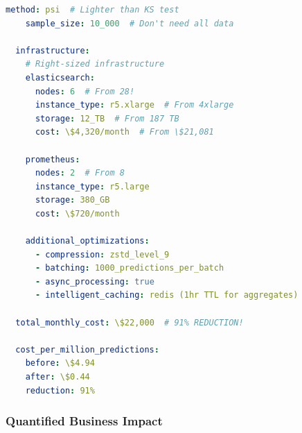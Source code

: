 \begin{lstlisting}[language=yaml, caption={Cost-Optimized Monitoring Configuration}]
    method: psi  # Lighter than KS test
    sample_size: 10_000  # Don't need all data

  infrastructure:
    # Right-sized infrastructure
    elasticsearch:
      nodes: 6  # From 28!
      instance_type: r5.xlarge  # From 4xlarge
      storage: 12_TB  # From 187 TB
      cost: \$4,320/month  # From \$21,081

    prometheus:
      nodes: 2  # From 8
      instance_type: r5.large
      storage: 380_GB
      cost: \$720/month

    additional_optimizations:
      - compression: zstd_level_9
      - batching: 1000_predictions_per_batch
      - async_processing: true
      - intelligent_caching: redis (1hr TTL for aggregates)

  total_monthly_cost: \$22,000  # 91% REDUCTION!

  cost_per_million_predictions:
    before: \$4.94
    after: \$0.44
    reduction: 91%
\end{lstlisting}

\subsubsection{Quantified Business Impact}

